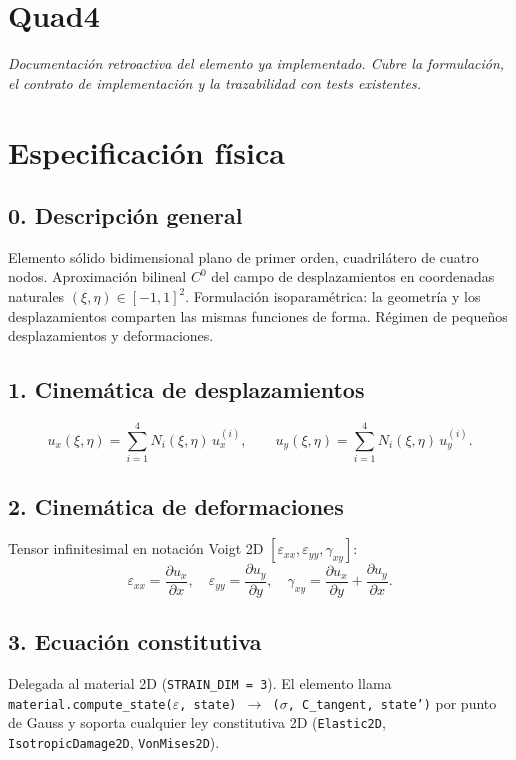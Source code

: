 \documentclass[11pt,letterpaper,oneside]{report}
\begin{document}
\newpage

\section{Quad4}



\textit{Documentación retroactiva del elemento ya implementado. Cubre la formulación, el contrato de implementación y la trazabilidad con tests existentes.}



\section{Especificación física}

\subsection{0. Descripción general}
Elemento sólido bidimensional plano de primer orden, cuadrilátero de cuatro nodos. Aproximación bilineal $C^0$ del campo de desplazamientos en coordenadas naturales $(\xi, \eta) \in [-1, 1]^2$. Formulación isoparamétrica: la geometría y los desplazamientos comparten las mismas funciones de forma. Régimen de pequeños desplazamientos y deformaciones.

\subsection{1. Cinemática de desplazamientos}
\[
u_x(\xi, \eta) = \sum_{i=1}^{4} N_i(\xi, \eta)\, u_x^{(i)}, \qquad u_y(\xi, \eta) = \sum_{i=1}^{4} N_i(\xi, \eta)\, u_y^{(i)}.
\]

\subsection{2. Cinemática de deformaciones}
Tensor infinitesimal en notación Voigt 2D $[\varepsilon_{xx}, \varepsilon_{yy}, \gamma_{xy}]$:
\[
\varepsilon_{xx} = \frac{\partial u_x}{\partial x}, \quad \varepsilon_{yy} = \frac{\partial u_y}{\partial y}, \quad \gamma_{xy} = \frac{\partial u_x}{\partial y} + \frac{\partial u_y}{\partial x}.
\]

\subsection{3. Ecuación constitutiva}
Delegada al material 2D (\texttt{STRAIN\_DIM = 3}). El elemento llama \texttt{material.compute\_state(\ensuremath{\varepsilon}, state) \ensuremath{\to} (\ensuremath{\sigma}, C\_tangent, state')} por punto de Gauss y soporta cualquier ley constitutiva 2D (\texttt{Elastic2D}, \texttt{IsotropicDamage2D}, \texttt{VonMises2D}).
\end{document}
